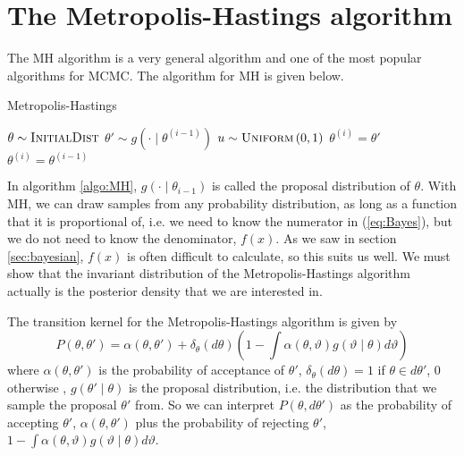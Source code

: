 \section{The Metropolis-Hastings algorithm}\label{subsec:mh}
The MH algorithm is a very general algorithm and one of the most popular algorithms for MCMC. 
The algorithm for MH is given below.
\begin{algorithm}[H]\label{algo:MH}
    \caption{Metropolis-Hastings}
    \label{algo:MH}
    \begin{algorithmic}[1] %
        \State $\theta \sim \textsc{InitialDist}$ 
        \State$\theta' \sim g\left(\cdot \mid \theta^{\left(i-1\right)}\right)$
        \State $u\sim \textsc{Uniform}\left(0,1\right)$
        \State $\theta^{\left(i\right)} = \theta'$
        \Else 
        \State $\theta^{\left(i\right)} = \theta^{\left(i-1\right)}$
         \EndIf
         \EndFor
    \end{algorithmic}
\end{algorithm}
In algorithm \ref{algo:MH}, $g\left(\cdot \mid \theta_{i-1}\right)$ is called the proposal distribution of $\theta$. 
With MH, we can draw samples from any probability distribution, as long as a function that it is proportional of, i.e. we need to know the numerator in (\ref{eq:Bayes}), but we do not need to know the denominator, $f\left(x\right)$.
As we saw in section \ref{sec:bayesian}, $f\left(x\right)$ is often difficult to calculate, so this suits us well. 
We must show that the invariant distribution of the Metropolis-Hastings algorithm actually is the posterior density that we are interested in.

The transition kernel for the Metropolis-Hastings algorithm is given by
\begin{equation}
    P\left(\theta, \theta'\right) = \alpha\left(\theta, \theta'\right) + \delta_{\theta} \left(d\theta\right)\left(1 - \int \alpha\left(\theta, \vartheta\right)g\left(\vartheta\mid \theta\right) d \vartheta \right)
\end{equation}
where $\alpha\left(\theta, \theta'\right)$ is the probability of acceptance of $\theta'$, $\delta_{\theta}\left(d\theta\right) = 1$ if  $\theta \in d\theta'$, $0$ otherwise \cite{chib1995understanding},  $g\left(\theta'\mid \theta\right)$ is the proposal distribution, i.e. the distribution that we sample the proposal $\theta'$ from. 
So we can interpret $P\left(\theta , d\theta'\right)$ as the probability of accepting $\theta'$,  $\alpha\left(\theta, \theta'\right)$ plus the probability of rejecting $\theta'$, 
$1 - \int \alpha\left(\theta, \vartheta\right) g\left(\vartheta\mid \theta \right) d\vartheta$. 

